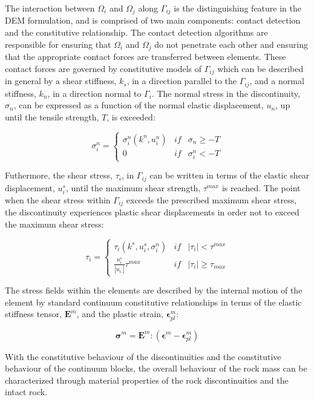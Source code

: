 
The interaction between $\Omega_i$ and $\Omega_j$ along $\Gamma_{ij}$ is the distinguishing feature in the DEM formulation, and is comprised of two main components: contact detection and the constitutive relationship. The contact detection algorithms are responsible for ensuring that $\Omega_i$ and $\Omega_j$ do not penetrate each other and ensuring that the appropriate contact forces are transferred between elements. These contact forces are governed by constitutive models of $\Gamma_{ij}$ which can be described in general by a shear stiffness, $k_s$, in a direction parallel to the $\Gamma_{ij}$, and a normal stiffness, $k_n$, in a direction normal to $\Gamma_i$. The normal stress in the discontinuity, $\sigma_n$, can be expressed as a function of the normal elastic displacement, $u_n$, up until the tensile strength, $T$, is exceeded: 

\begin{equation}
\sigma^n_i=\left\{\begin{matrix}
\sigma^n_i\left(k^n, u_i^n\right) &if&\sigma_n \geq -T\\ 
 0 & if &\sigma^n_i < -T
\end{matrix}\right.
\label{eqn:demnormal}
\end{equation}

Futhermore, the shear stress, $\tau_i$, in $\Gamma_{ij}$ can be written in terms of the elastic shear displacement, $u_i^s$, until the maximum shear strength, $\tau^{max}$ is reached. The point when the shear stress within $\Gamma_{ij}$ exceeds the prescribed maximum shear stress, the discontinuity experiences plastic shear displacements in order not to exceed the maximum shear stress:

\begin{equation}
\tau_i=\left\{\begin{matrix}
\tau_i\left(k^s,u_i^s, \sigma_i^n\right) &if&\left |\tau_i \right | < \tau^{max}\\ 
\frac{u_i^s}{\left|u_i_^s\right|}\tau^{max} & if &\left |\tau_i \right | \geq \tau_{max}
\end{matrix}\right.
\label{eqn:demshear}
\end{equation}

The stress fields within the elements are described by the internal motion of the element by standard continuum constitutive relationships in terms of the elastic stiffness tensor, $\mathbf{E}^m$, and the plastic strain, $\boldsymbol{\epsilon}^m_{pl}$:  

\begin{equation}
\boldsymbol{\sigma}^m =\mathbf{E}^m:\left(\boldsymbol{\epsilon}^m - \boldsymbol{\epsilon}^m_{pl}\right)
\label{eqn:demcont}
\end{equation}

With the constitutive behaviour of the discontinuities and the constitutive behaviour of the continuum blocks, the overall behaviour of the rock mass can be characterized through material properties of the rock discontinuities and the intact rock.